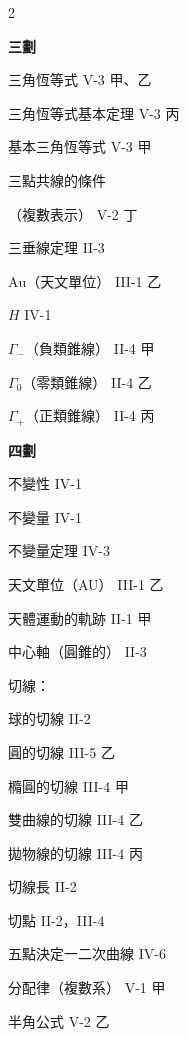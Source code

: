 \begin{multicols}{2}
\vspace{0.8em}
\begin{center}
\textbf{\large 三\quad 劃}
\end{center}

\noindent 三角恆等式 \hfill V-3 甲、乙\par
\noindent 三角恆等式基本定理 \hfill V-3 丙\par
\noindent 基本三角恆等式 \hfill V-3 甲\par
\noindent 三點共線的條件\par
\noindent\hspace*{1.5em} （複數表示） \hfill V-2 丁\par
\noindent 三垂線定理 \hfill II-3\par
\noindent $\text{Au}$（天文單位） \hfill III-1 乙\par
\noindent $H$ \hfill IV-1\par
\noindent $\Gamma_-$（負類錐線） \hfill II-4 甲\par
\noindent $\Gamma_0$（零類錐線） \hfill II-4 乙\par
\noindent $\Gamma_+$（正類錐線） \hfill II-4 丙\par

\vspace{0.8em}
\begin{center}
\textbf{\large 四\quad 劃}
\end{center}

\noindent 不變性 \hfill IV-1\par
\noindent 不變量 \hfill IV-1\par
\noindent 不變量定理 \hfill IV-3\par
\noindent 天文單位（AU） \hfill III-1 乙\par
\noindent 天體運動的軌跡 \hfill II-1 甲\par
\noindent 中心軸（圓錐的） \hfill II-3\par
\noindent 切線：\par
\noindent\hspace*{1.5em} 球的切線 \hfill II-2\par
\noindent\hspace*{1.5em} 圓的切線 \hfill III-5 乙\par
\noindent\hspace*{1.5em} 橢圓的切線 \hfill III-4 甲\par
\noindent\hspace*{1.5em} 雙曲線的切線 \hfill III-4 乙\par
\noindent\hspace*{1.5em} 拋物線的切線 \hfill III-4 丙\par
\noindent 切線長 \hfill II-2\par
\noindent 切點 \hfill II-2，III-4\par
\noindent 五點決定一二次曲線 \hfill IV-6\par
\noindent 分配律（複數系） \hfill V-1 甲\par
\noindent 半角公式 \hfill V-2 乙\par


\end{multicols}
